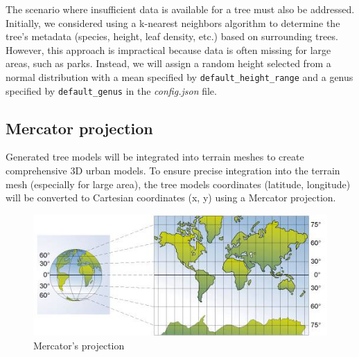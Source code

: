 \documentclass[12pt]{article}
\begin{document}
The scenario where insufficient data is available for a tree must also be
addressed. Initially, we considered using a k-nearest neighbors
algorithm\cite{k-nn} to determine the tree's metadata (species, height,
leaf density, etc.) based on surrounding trees. However, this approach is
impractical because data is often missing for large areas, such as parks.
Instead, we will assign a random height selected from a normal distribution with
a mean specified by \texttt{default\_height\_range} and a genus specified by
\texttt{default\_genus} in the \textit{config.json} file.

\subsection{Mercator projection}

Generated tree models will be integrated into terrain meshes to create comprehensive
3D urban models. To ensure precise integration into the terrain mesh (especially for large area), the tree models coordinates
(latitude, longitude) will be converted to Cartesian coordinates (x, y) using
a Mercator projection\cite{mercator-proj}.

\begin{figure}[H]
    \centering
    \includegraphics[width=1\textwidth]{images/mercator.jpg}
    \caption{Mercator's projection\cite{img:mercator}}
\end{figure}
\end{document}
